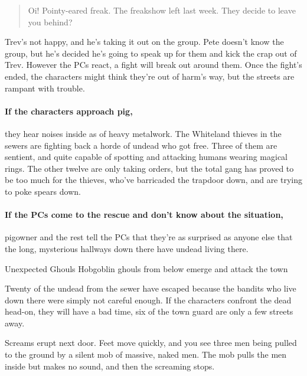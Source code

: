 \begin{multicols}{2}
\begin{boxtext}
\begin{quotation}

	Oi! Pointy-eared freak.  The freakshow left last week.  They decide to leave you behind?

\end{quotation}

\end{boxtext}

Trev's not happy, and he's taking it out on the group.
Pete doesn't know the group, but he's decided he's going to speak up for them and kick the crap out of Trev.
However the PCs react, a fight will break out around them.
Once the fight's ended, the characters might think they're out of harm's way, but the streets are rampant with trouble.


\paragraph{If the characters approach \gls{pig},}
they hear noises inside as of heavy metalwork.
The Whiteland thieves in the sewers are fighting back a horde of undead who got free.
Three of them are sentient, and quite capable of spotting and attacking humans wearing magical rings.
The other twelve are only taking orders, but the total gang has proved to be too much for the thieves, who've barricaded the trapdoor down, and are trying to poke spears down.

\paragraph{If the PCs come to the rescue and don't know about the situation,}
\gls{pigowner} and the rest tell the PCs that they're as surprised as anyone else that the long, mysterious hallways down there have undead living there.

{\N \N Unexpected Ghouls}%
{Hobgoblin ghouls from below emerge and attack the town}%

Twenty of the undead from the sewer have escaped because the bandits who live down there were simply not careful enough.  If the characters confront the dead head-on, they will have a bad time, six of the town guard are only a few streets away.

\begin{boxtext}

	Screams erupt next door.
	Feet move quickly, and you see three men being pulled to the ground by a silent mob of massive, naked men.
	The mob pulls the men inside but makes no sound, and then the screaming stops.


\end{boxtext}
\end{multicols}
